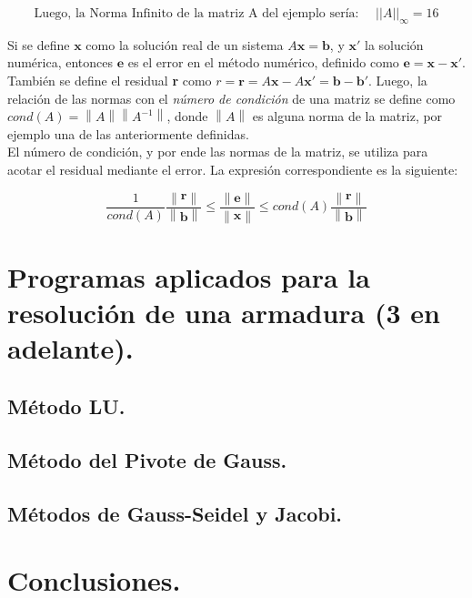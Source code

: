 \documentclass[12pt, notitlepage]{article}
\newcommand{\norm}[1]{\left\lVert#1\right\rVert}
\begin{document}
\begin{equation*}
\text{Luego, la Norma Infinito de la matriz A del ejemplo sería: } \quad ||A||_\infty = 16
\end{equation*}

Si se define $\textbf{x}$ como la solución real de un sistema $A\textbf{x} = \textbf{b}$, y $\textbf{x}'$ la solución numérica, entonces $\textbf{e}$ es el error en el método numérico, definido como $\mathbf{e} = \mathbf{x} - \mathbf{x}'$.\\
También se define el residual \textbf{r} como $r = \mathbf{r} = A\mathbf{x} - A\mathbf{x}' = \mathbf{b} - \mathbf{b}'$. Luego, la relación de las normas con el \textit{número de condición} de una matriz se define como $cond(A) = \norm{A}\norm{A^{-1}}$, donde $\norm{A}$ es alguna norma de la matriz, por ejemplo una de las anteriormente definidas.\\

El número de condición, y por ende las normas de la matriz, se utiliza para acotar el residual mediante el error. La expresión correspondiente es la siguiente:

\begin{equation*}
\frac{1}{cond(A)} \frac{\norm{\mathbf{r}}}{\norm{\mathbf{b}}} \leq \frac{\norm{\mathbf{e}}}{\norm{\mathbf{x}}} \leq cond(A)\frac{\norm{\mathbf{r}}}{\norm{\mathbf{b}}}
\end{equation*}

\newpage

\section{Programas aplicados para la resolución de una armadura (3 en adelante).}



\newpage

\subsection{Método LU.}



\newpage

\subsection{Método del Pivote de Gauss.}



\newpage

\subsection{Métodos de Gauss-Seidel y Jacobi.}



\newpage

\section{Conclusiones.}



\newpage

\begin{thebibliography}{3}



\end{thebibliography}
\end{document}
